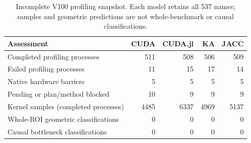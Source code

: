 \begin{table}[t]\centering\small
\caption{Incomplete V100 profiling snapshot. Each model retains all 537 names; samples and geometric predictions are not whole-benchmark or causal classifications.}\label{tab:v100-campaign-progress}
\begin{tabular}{lrrrr}\toprule
Assessment & CUDA & CUDA.jl & KA & JACC\\\midrule
Completed profiling processes & 511 & 508 & 506 & 509\\
Failed profiling processes & 11 & 15 & 17 & 14\\
Native hardware barriers & 5 & 5 & 5 & 5\\
Pending or plan/method blocked & 10 & 9 & 9 & 9\\
Kernel samples (completed processes) & 4485 & 6337 & 4969 & 5137\\
Whole-ROI geometric classifications & 0 & 0 & 0 & 0\\
Causal bottleneck classifications & 0 & 0 & 0 & 0\\
\bottomrule\end{tabular}
\end{table}

